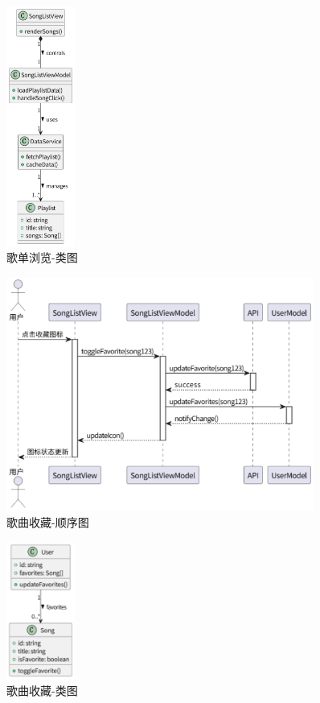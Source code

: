 \documentclass{base}
\numberwithin{figure}{section} %
\begin{document}
\begin{figure}[H]
    \centering
    \includegraphics[width=0.2\textwidth]{images/5-4.png}
    \caption{歌单浏览-类图}
\end{figure}
\begin{figure}[H]
    \centering
    \includegraphics[width=0.9\textwidth]{images/5-5.png}
    \caption{歌曲收藏-顺序图}
\end{figure}
\begin{figure}[H]
    \centering
    \includegraphics[width=0.2\textwidth]{images/5-6.png}
    \caption{歌曲收藏-类图}
\end{figure}
\end{document}
